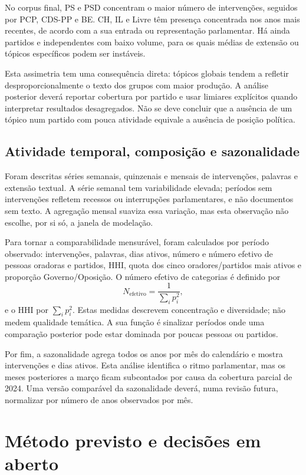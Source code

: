 \documentclass[11pt,a4paper]{article}
\begin{document}
No corpus final, PS e PSD concentram o maior número de intervenções, seguidos por PCP, CDS-PP e BE. CH, IL e Livre têm presença concentrada nos anos mais recentes, de acordo com a sua entrada ou representação parlamentar. Há ainda partidos e independentes com baixo volume, para os quais médias de extensão ou tópicos específicos podem ser instáveis.

Esta assimetria tem uma consequência direta: tópicos globais tendem a refletir desproporcionalmente o texto dos grupos com maior produção. A análise posterior deverá reportar cobertura por partido e usar limiares explícitos quando interpretar resultados desagregados. Não se deve concluir que a ausência de um tópico num partido com pouca atividade equivale a ausência de posição política.

\subsection{Atividade temporal, composição e sazonalidade}

Foram descritas séries semanais, quinzenais e mensais de intervenções, palavras e extensão textual. A série semanal tem variabilidade elevada; períodos sem intervenções refletem recessos ou interrupções parlamentares, e não documentos sem texto. A agregação mensal suaviza essa variação, mas esta observação não escolhe, por si só, a janela de modelação.

Para tornar a comparabilidade mensurável, foram calculados por período observado: intervenções, palavras, dias ativos, número e número efetivo de pessoas oradoras e partidos, HHI, quota dos cinco oradores/partidos mais ativos e proporção Governo/Oposição. O número efetivo de categorias é definido por
\[
N_{\mathrm{efetivo}} = \frac{1}{\sum_i p_i^2},
\]
e o HHI por $\sum_i p_i^2$. Estas medidas descrevem concentração e diversidade; não medem qualidade temática. A sua função é sinalizar períodos onde uma comparação posterior pode estar dominada por poucas pessoas ou partidos.

Por fim, a sazonalidade agrega todos os anos por mês do calendário e mostra intervenções e dias ativos. Esta análise identifica o ritmo parlamentar, mas os meses posteriores a março ficam subcontados por causa da cobertura parcial de 2024. Uma versão comparável da sazonalidade deverá, numa revisão futura, normalizar por número de anos observados por mês.

\section{Método previsto e decisões em aberto}
\end{document}
